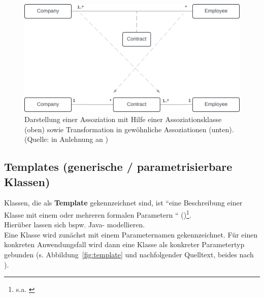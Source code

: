\begin{figure}
    \centering
    \includegraphics[scale=0.4]{part three/Klassendiagramme - Erweiterte Konzepte und Paketdiagramme/img/assoziationsklasse}
    \caption{Darstellung einer Assoziation mit Hilfe einer Assoziationsklasse (oben) sowie Transformation in gewöhnliche Assoziationen (unten). (Quelle: in Anlehnung an \cite[279, Abb. 4.4-11]{Oes05})}
    \label{fig:assoziationsklasse}
\end{figure}

\subsection{Templates (generische / parametrisierbare Klassen)}
Klassen, die als \textbf{Template} gekennzeichnet sind, ist ``eine Beschreibung einer Klasse mit einem oder mehreren formalen Parametern `` (\cite[253]{Bal05})\footnote{
s.a. \cite[103 ff.]{OMG17}
}.\\

Hierüber lassen sich bspw. Java- modellieren.\\

\noindent
Eine Klasse wird zunächst mit einem Parameternamen gekennzeichnet.
Für einen konkreten Anwendungsfall wird dann eine Klasse als konkreter Parametertyp gebunden (s. Abbildung~\ref{fig:template} und nachfolgender Quelltext, beides nach \cite[81 f.]{Fow03b}).

